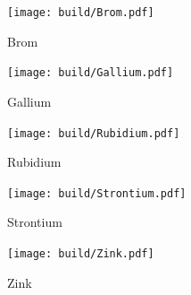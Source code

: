 \begin{figure}[H]
  \centering
  \texttt{[image: build/Brom.pdf]}
  \caption{Brom}
  \label{fig:Brom}
\end{figure}

\begin{figure}[H]
  \centering
  \texttt{[image: build/Gallium.pdf]}
  \caption{Gallium}
  \label{fig:Gallium}
\end{figure}

\begin{figure}[H]
  \centering
  \texttt{[image: build/Rubidium.pdf]}
  \caption{Rubidium}
  \label{fig:Rubidium}
\end{figure}

\begin{figure}[H]
  \centering
  \texttt{[image: build/Strontium.pdf]}
  \caption{Strontium}
  \label{fig:Strontium}
\end{figure}

\begin{figure}[H]
  \centering
  \texttt{[image: build/Zink.pdf]}
  \caption{Zink}
  \label{fig:Zink}
\end{figure}